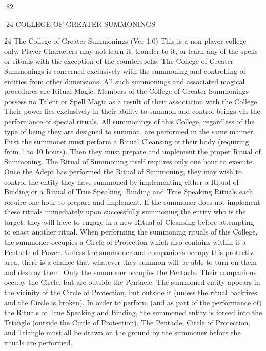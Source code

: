 \documentclass[a4paper]{article}
\begin{document}
\begin{multicols}{3}
82

24 COLLEGE OF GREATER SUMMONINGS

24 The College of Greater Summonings (Ver 1.0)
This is a non-player college only. Player Characters may not learn it, transfer to it, or learn
any of the spells or rituals with the exception of
the counterspells.
The College of Greater Summonings is concerned
exclusively with the summoning and controlling of
entities from other dimensions. All such summonings and associated magical procedures are Ritual
Magic. Members of the College of Greater Summonings possess no Talent or Spell Magic as a
result of their association with the College. Their
power lies exclusively in their ability to summon
and control beings via the performance of special
rituals.
All summonings of this College, regardless of the
type of being they are designed to summon, are
performed in the same manner. First the summoner
must perform a Ritual Cleansing of their body
(requiring from 1 to 10 hours). Then they must
prepare and implement the proper Ritual of Summoning. The Ritual of Summoning itself requires
only one hour to execute. Once the Adept has
performed the Ritual of Summoning, they may
wish to control the entity they have summoned by
implementing either a Ritual of Binding or a Ritual
of True Speaking. Binding and True Speaking
Rituals each require one hour to prepare and implement. If the summoner does not implement
these rituals immediately upon successfully summoning the entity who is the target, they will have
to engage in a new Ritual of Cleansing before
attempting to enact another ritual.
When performing the summoning rituals of this
College, the summoner occupies a Circle of Protection which also contains within it a Pentacle of
Power. Unless the summoner and companions
occupy this protective area, there is a chance that
whatever they summon will be able to turn on them
and destroy them. Only the summoner occupies the
Pentacle. Their companions occupy the Circle, but
are outside the Pentacle.
The summoned entity appears in the vicinity of the
Circle of Protection, but outside it (unless the ritual
backfires and the Circle is broken). In order to
perform (and as part of the performance of) the
Rituals of True Speaking and Binding, the summoned entity is forced into the Triangle (outside
the Circle of Protection).
The Pentacle, Circle of Protection, and Triangle
must all be drawn on the ground by the summoner
before the rituals are performed.


\end{multicols}
\end{document}
